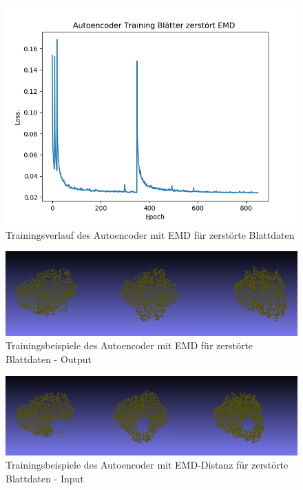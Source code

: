 \documentclass{llncs}
\begin{document}
\begin{figure}[htbp] 
	\centering
	\includegraphics[width=1.0\textwidth]{autoencoder_training_bleatter_zer_result_emd.png}
	\caption{Trainingsverlauf des Autoencoder mit EMD für zerstörte Blattdaten }
	\label{fig:Bild71}
\end{figure}
\begin{figure}[htbp] 
	\centering
	\includegraphics[width=1.0\textwidth]{repairded_emd.png}
	\caption{Trainingsbeispiele des Autoencoder mit EMD für zerstörte Blattdaten - Output}
	\label{fig:Bild72}
\end{figure}
\begin{figure}[htbp] 
	\centering
	\includegraphics[width=1.0\textwidth]{input_emd.png}
	\caption{Trainingsbeispiele des Autoencoder mit EMD-Distanz für zerstörte Blattdaten - Input}
	\label{fig:Bild69}
\end{figure}
\newpage
\end{document}
